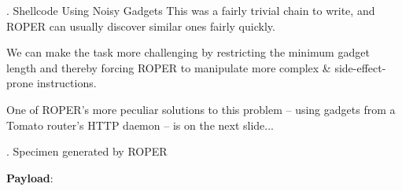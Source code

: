 \documentclass[9pt]{beamer}
\newcommand{\Gap} { \\ \pause \vspace{8pt} }
\begin{document}
\begin{frame}{\theframenumber. Shellcode Using Noisy Gadgets}
  This was a fairly trivial chain to write, and ROPER can usually discover similar ones fairly quickly. \Gap
  
  We can make the task more challenging by restricting the minimum gadget length and thereby forcing ROPER to manipulate more complex \& side-effect-prone instructions. \Gap
  
  One of ROPER's more peculiar solutions to this problem -- using gadgets from a Tomato router's HTTP daemon -- is on the next slide...
\end{frame}

\begin{frame}{\theframenumber. Specimen generated by ROPER}

  \tiny
  \textbf{Payload}:
  \\
  

\end{frame}
\end{document}
